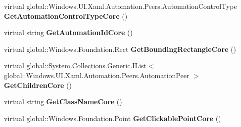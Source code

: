 \begin{DoxyCompactItemize}
\item 
\mbox{\label{class_windows_1_1_u_i_1_1_xaml_1_1_automation_1_1_peers_1_1_automation_peer_af2422569cceaff985ea73cae254225e7}} 
virtual global\+::\+Windows.\+U\+I.\+Xaml.\+Automation.\+Peers.\+Automation\+Control\+Type {\bfseries Get\+Automation\+Control\+Type\+Core} ()
\item 
\mbox{\label{class_windows_1_1_u_i_1_1_xaml_1_1_automation_1_1_peers_1_1_automation_peer_a014ee70abfd483498acd60d958afc21e}} 
virtual string {\bfseries Get\+Automation\+Id\+Core} ()
\item 
\mbox{\label{class_windows_1_1_u_i_1_1_xaml_1_1_automation_1_1_peers_1_1_automation_peer_a3c155bdaac9b35e1c7bb423d47fd707d}} 
virtual global\+::\+Windows.\+Foundation.\+Rect {\bfseries Get\+Bounding\+Rectangle\+Core} ()
\item 
\mbox{\label{class_windows_1_1_u_i_1_1_xaml_1_1_automation_1_1_peers_1_1_automation_peer_a09114f6788a9e206e93a6ffbd12620bf}} 
virtual global\+::\+System.\+Collections.\+Generic.\+I\+List$<$ global\+::\+Windows.\+U\+I.\+Xaml.\+Automation.\+Peers.\+Automation\+Peer $>$ {\bfseries Get\+Children\+Core} ()
\item 
\mbox{\label{class_windows_1_1_u_i_1_1_xaml_1_1_automation_1_1_peers_1_1_automation_peer_a11d5725a1c02165300ffbcf264f7b2b3}} 
virtual string {\bfseries Get\+Class\+Name\+Core} ()
\item 
\mbox{\label{class_windows_1_1_u_i_1_1_xaml_1_1_automation_1_1_peers_1_1_automation_peer_a08e12f22ea4a043975f822abaf961ce4}} 
virtual global\+::\+Windows.\+Foundation.\+Point {\bfseries Get\+Clickable\+Point\+Core} ()
\item 
\mbox{\label{class_windows_1_1_u_i_1_1_xaml_1_1_automation_1_1_peers_1_1_automation_peer_a7a8535136acdad3cca9f8c95a6ecc9e0}} 

\end{DoxyCompactItemize}
